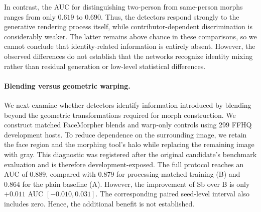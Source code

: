 In contrast, the AUC for distinguishing two-person
from same-person morphs ranges from only
$0.619$ to $0.690$.
Thus, the detectors respond strongly to the
generative rendering process itself, while
contributor-dependent discrimination is
considerably weaker. The latter remains above
chance in these comparisons, so we cannot conclude
that identity-related information is entirely absent.
However, the observed differences do not establish
that the networks recognize identity mixing rather
than residual generation or low-level statistical
differences.

\paragraph{Blending versus geometric warping.}
We next examine whether detectors identify information
introduced by blending beyond the geometric
transformations required for morph construction. We construct matched FaceMorpher blends and warp-only
controls using 299 FFHQ development hosts.
To reduce dependence on the surrounding image,
we retain the face region and the morphing tool's
halo while replacing the remaining image with gray.
This diagnostic was registered after the original
candidate's benchmark evaluation and is therefore
development-exposed.%
The full protocol reaches an AUC of $0.889$,
compared with $0.879$ for processing-matched
training (B) and $0.864$ for the plain baseline (A).
%
However, the improvement of Sb over B is only
$+0.011$ AUC
$[-0.010,0.031]$. The corresponding paired
seed-level interval also includes zero.
Hence, the additional benefit is not established.




